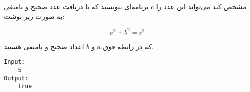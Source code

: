
برنامه‌ای بنویسید که با دریافت عدد صحیح و نامنفی c مشخص کند می‌تواند این عدد را به صورت زیر نوشت:

\[
  a^{2} + b^{2} = c^{2}
\]

که در رابطه فوق $a$ و $b$ اعداد صحیح و نامنفی هستند.

\begin{latin}
\begin{verbatim}
Input:
    5
Output:
    true
\end{verbatim}
\end{latin}
